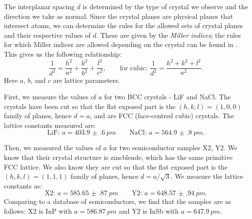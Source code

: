 \documentclass[11pt,a4paper,twoside,onecolumn]{article}
\begin{document}
The interplanar spacing $d$ is determined by the type of crystal we observe and the direction we take as normal. Since the crystal planes are physical planes that intersect atoms, we can determine the rules for the allowed sets of crystal planes and their respective values of $d$. These are given by the \emph{Miller indices}; the rules for which Miller indices are allowed depending on the crystal can be found in \cite{OxfPhys2010}. This gives us the following relationship:
\begin{equation}
    \frac{1}{d^2} = \frac{h^2}{a^2} + \frac{k^2}{b^2} + \frac{l^2}{c^2}, \qquad \text{for cubic: } \frac{1}{d^2} = \frac{h^2 + k^2 + l^2}{a^2}.
\end{equation}
Here $a$, $b$, and $c$ are lattice parameters.

First, we measure the values of $a$ for two BCC crystals - LiF and NaCl. The crystals have been cut so that the flat exposed part is the $\left(h,k,l\right) = \left(1,0,0\right)$ family of planes, hence $d = a$, and are FCC (face-centred cubic) crystals. The lattice constants measured are:
\begin{equation}
    \text{LiF: } a = \qty[separate-uncertainty-units = single]{403.9(6)}{pm} \qquad \text{NaCl: } a = \qty[separate-uncertainty-units = single]{564.9(8)}{pm}.
\end{equation}

Then, we measured the values of $a$ for two semiconductor samples X2, Y2. We know that their crystal structure is zincblende, which has the same primitive FCC lattice. We also know they are cut so that the flat exposed part is the $\left(h,k,l\right) = \left(1,1,1\right)$ family of planes, hence $d = a / \sqrt{3}$. We measure the lattice constants as:
\begin{equation}
    \text{X2: } a = \qty[separate-uncertainty-units = single]{585.65(87)}{pm} \qquad \text{Y2: } a = \qty[separate-uncertainty-units = single]{648.57(94)}{pm}.
\end{equation}
Comparing to a database of semiconductors, we find that the samples are as follows: X2 is InP with $a = \qty{586.87}{pm}$ and Y2 is InSb with $a = \qty{647.9}{pm}$.
\end{document}
